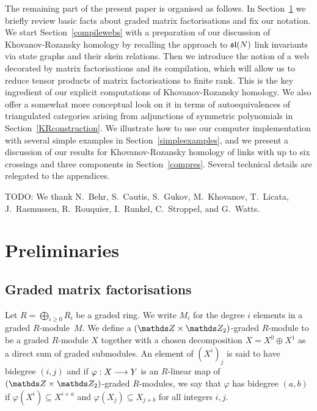 \documentclass{compositio}
\theoremstyle{definition}
\numberwithin{equation}{section}
\begin{document}
\medskip

The remaining part of the present paper is organised as follows. In Section~\ref{preliminaries} we briefly review basic facts about graded matrix factorisations and fix our notation. We start Section~\ref{compilewebs} with a preparation of our discussion of Khovanov-Rozansky homology by recalling the approach to $\mathfrak{sl}(N)$ link invariants via state graphs and their skein relations. Then we introduce the notion of a web decorated by matrix factorisations and its compilation, which will allow us to reduce tensor products of matrix factorisations to finite rank. This is the key ingredient of our explicit computations of Khovanov-Rozansky homology. We also offer a somewhat more conceptual look on it in terms of autoequivalences of triangulated categories arising from adjunctions of symmetric polynomials in Section~\ref{KRconstruction}. We illustrate how to use our computer implementation with several simple examples in Section~\ref{simpleexamples}, and we present a discussion of our results for Khovanov-Rozansky homology of links with up to six crossings and three components in Section~\ref{compres}. Several technical details are relegated to the appendices. 


\begin{acknowledgements}
TODO: We thank N.~Behr, S.~Cautis, S.~Gukov, M.~Khovanov, T.~Licata, J.~Rasmussen, R.~Rouquier, I.~Runkel, C.~Stroppel, and G.~Watts. 
\end{acknowledgements}


\section{Preliminaries}
\label{preliminaries}


\subsection{Graded matrix factorisations}

Let $R = \bigoplus_{i \ge 0} R_i$ be a graded ring. We write $M_i$ for the degree $i$ elements in a graded $R$-module~$M$. We define a $(\ZZ \times \Ztwo)$-graded $R$-module to be a graded $R$-module $X$ together with a chosen decomposition $X = X^0 \oplus X^1$ as a direct sum of graded submodules. An element of $(X^i)_j$ is said to have bidegree $(i,j)$ and if $\varphi: X \longrightarrow Y$ is an $R$-linear map of $(\ZZ \times \Ztwo)$-graded $R$-modules, we say that $\varphi$ has bidegree $(a,b)$ if $\varphi(X^i) \subseteq X^{i+a}$ and $\varphi(X_j) \subseteq X_{j+b}$ for all integers $i,j$.
\end{document}
